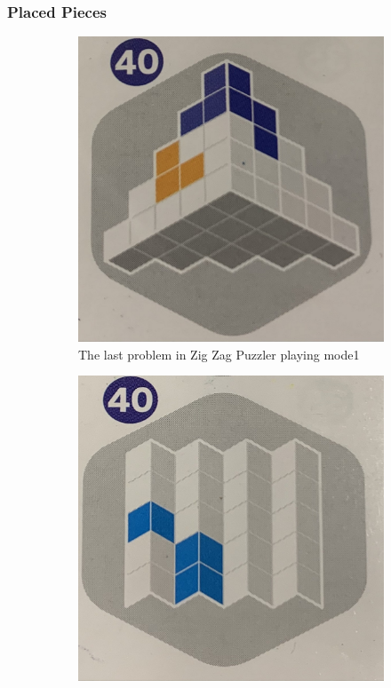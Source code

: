 \subsubsection{Placed Pieces}
\begin{figure}[htbp]
    \centering
    \begin{subfigure}[b]{.45\textwidth}
    \centering
    \includegraphics[width=\textwidth]{figs/mode1.jpg}
    \caption{The last problem in Zig Zag Puzzler playing mode1}
    \label{fig:game2mode1}
    \end{subfigure}
     \begin{subfigure}[b]{.45\textwidth}
     \centering
      \includegraphics[width=\textwidth]{figs/mode2.jpg}

\end{subfigure}
\end{figure}
